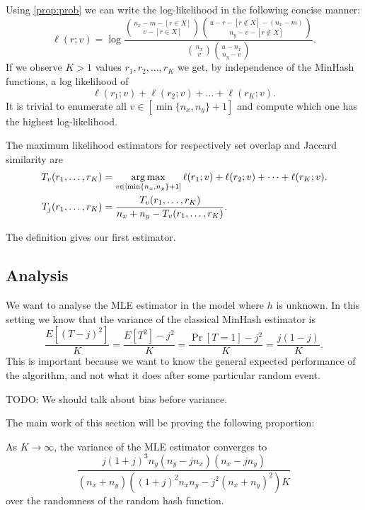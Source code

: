 Using \cref{prop:prob} we can write the log-likelihood in the following concise manner:
\[
   \ell(r; v) = \log \frac{\binom{n_x-m-[r\in X]}{v-[r\in X]}\binom{u-r-[r\not\in X]-(n_x-m)}{n_y-v-[r\not\in X]}}{\binom{n_x}{v}\binom{u-n_x}{n_y-v}}.
   \label{eq:log-likelihood}
\]
If we observe $K>1$ values $r_1, r_2, \dots, r_K$ we get, by independence of the MinHash functions, a log likelihood of
\[
   \ell(r_1; v) + \ell(r_2; v) + \dots + \ell(r_K; v).
\]
It is trivial to enumerate all $v\in[\min\{n_x,n_y\}+1]$ and compute which one has the highest log-likelihood.
\begin{definition}
   The maximum likelihood estimators for respectively set overlap and Jaccard similarity are
   \begin{align}
      T_v(r_1,\dots,r_K) &= \operatorname*{arg\,max}_{v\in[\min\{n_x,n_y\}+1]} \ell(r_1; v) + \ell(r_2; v) + \dots + \ell(r_K; v).
      \\T_j(r_1,\dots,r_K) &= \frac{T_v(r_1,\dots,r_K)}{n_x+n_y - T_v(r_1,\dots,r_K)}.
   \end{align}
\end{definition}
%
The definition gives our first estimator.

\subsection{Analysis}

We want to analyse the MLE estimator in the model where $h$ is unknown.
In this setting we know that the variance of the classical MinHash estimator is
\[
   \frac{E[(T-j)^2]}{K}
      = \frac{E[T^2] - j^2}{K}
      = \frac{\Pr[T=1] - j^2}{K}
      = \frac{j(1-j)}{K}.
      \label{eq:minvar}
\]
This is important because we want to know the general expected performance of the algorithm, and not what it does after some particular random event.

TODO: We should talk about bias before variance.

The main work of this section will be proving the following proportion:
\begin{proposition}\label{prop:mle_var}
   As $K\to\infty$, the variance of the MLE estimator converges to
   \[
      \frac{j (1+j)^3 n_y (n_y-j n_x) (n_x-j n_y)}{(n_x+n_y) \left((1+j)^2 n_xn_y - j^2 (n_x+n_y)^2\right)K}
   \label{eq:mle_var}
   \]
   over the randomness of the random hash function.
\end{proposition}

